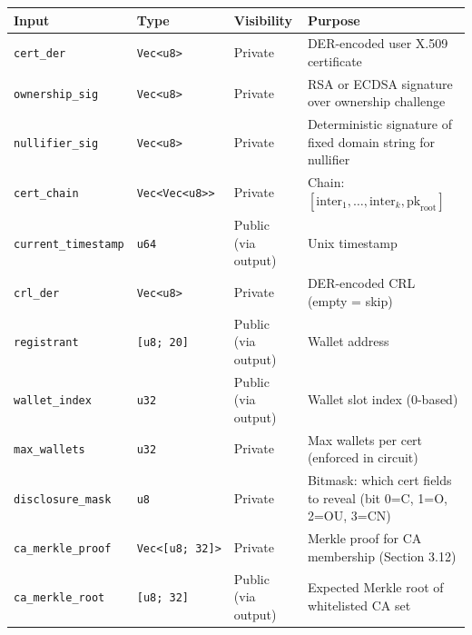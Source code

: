 \documentclass[11pt, a4paper]{article}
\begin{document}
\begin{longtable}[]{@{}
  >{\raggedright\arraybackslash}p{}
  >{\raggedright\arraybackslash}p{}
  >{\raggedright\arraybackslash}p{}
  >{\raggedright\arraybackslash}p{}@{}}
\toprule\noalign{}
\begin{minipage}[b]{\linewidth}\raggedright
Input
\end{minipage} & \begin{minipage}[b]{\linewidth}\raggedright
Type
\end{minipage} & \begin{minipage}[b]{\linewidth}\raggedright
Visibility
\end{minipage} & \begin{minipage}[b]{\linewidth}\raggedright
Purpose
\end{minipage} \\
\midrule\noalign{}
\endhead
\bottomrule\noalign{}
\endlastfoot
\texttt{cert\_der} & \texttt{Vec\textless{}u8\textgreater{}} & Private &
DER-encoded user X.509 certificate \\
\texttt{ownership\_sig} & \texttt{Vec\textless{}u8\textgreater{}} &
Private & RSA or ECDSA signature over ownership challenge \\
\texttt{nullifier\_sig} & \texttt{Vec\textless{}u8\textgreater{}} &
Private & Deterministic signature of fixed domain string for
nullifier \\
\texttt{cert\_chain} &
\texttt{Vec\textless{}Vec\textless{}u8\textgreater{}\textgreater{}} &
Private & Chain:
\([\text{inter}_1, \ldots, \text{inter}_k, \text{pk}_{\text{root}}]\) \\
\texttt{current\_timestamp} & \texttt{u64} & Public (via output) & Unix
timestamp \\
\texttt{crl\_der} & \texttt{Vec\textless{}u8\textgreater{}} & Private &
DER-encoded CRL (empty = skip) \\
\texttt{registrant} & \texttt{{[}u8;\ 20{]}} & Public (via output) &
Wallet address \\
\texttt{wallet\_index} & \texttt{u32} & Public (via output) & Wallet
slot index (0-based) \\
\texttt{max\_wallets} & \texttt{u32} & Private & Max wallets per cert
(enforced in circuit) \\
\texttt{disclosure\_mask} & \texttt{u8} & Private & Bitmask: which cert
fields to reveal (bit 0=C, 1=O, 2=OU, 3=CN) \\
\texttt{ca\_merkle\_proof} &
\texttt{Vec\textless{}{[}u8;\ 32{]}\textgreater{}} & Private & Merkle
proof for CA membership (Section 3.12) \\
\texttt{ca\_merkle\_root} & \texttt{{[}u8;\ 32{]}} & Public (via output)
& Expected Merkle root of whitelisted CA set \\
\end{longtable}
\end{document}
